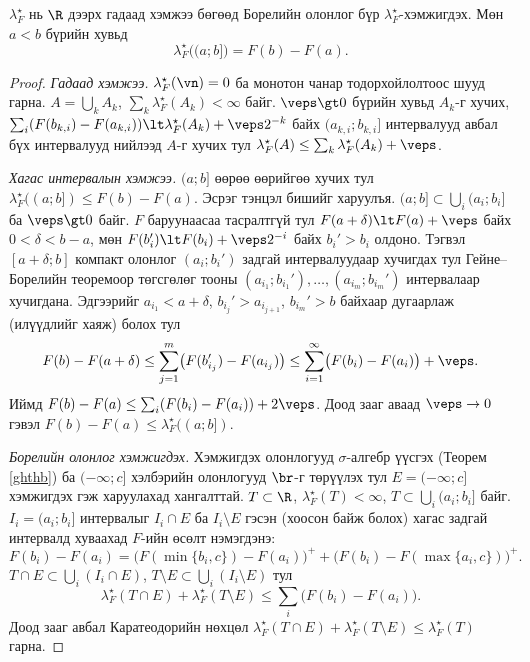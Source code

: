 \begin{thm}\label{lsmeas}
$\lambda_F^{\star}$ нь $\R$ дээрх гадаад хэмжээ бөгөөд Борелийн олонлог бүр $\lambda_F^{\star}$-хэмжигдэх. Мөн $a\lt b$ бүрийн хувьд
$$\lambda_F^{\star}\bigl((a;b]\bigr)=F(b)-F(a).$$
\end{thm}
\begin{proof}
\textit{Гадаад хэмжээ.} $\lambda_F^{\star}(\vn)=0$ ба монотон чанар тодорхойлолтоос шууд гарна. $A=\bigcup_kA_k$, $\sum_k\lambda_F^{\star}(A_k)\lt\infty$ байг. $\veps\gt 0$ бүрийн хувьд $A_k$-г хучих, $\sum_i(F(b_{k,i})-F(a_{k,i}))\lt\lambda_F^{\star}(A_k)+\veps 2^{-k}$ байх $(a_{k,i};b_{k,i}]$ интервалууд авбал бүх интервалууд нийлээд $A$-г хучих тул $\lambda_F^{\star}(A)\leq\sum_k\lambda_F^{\star}(A_k)+\veps$.

\textit{Хагас интервалын хэмжээ.} $(a;b]$ өөрөө өөрийгөө хучих тул $\lambda_F^{\star}((a;b])\leq F(b)-F(a)$. Эсрэг тэнцэл бишийг харуулъя. $(a;b]\subset\bigcup_i(a_i;b_i]$ ба $\veps\gt 0$ байг. $F$ баруунаасаа тасралтгүй тул $F(a+\delta)\lt F(a)+\veps$ байх $0\lt\delta\lt b-a$, мөн $F(b_i')\lt F(b_i)+\veps 2^{-i}$ байх $b_i'\gt b_i$ олдоно. Тэгвэл $[a+\delta;b]$ компакт олонлог $(a_i;b_i')$ задгай интервалуудаар хучигдах тул Гейне--Борелийн теоремоор төгсгөлөг тооны $(a_{i_1};b_{i_1}'),\ldots,(a_{i_m};b_{i_m}')$ интервалаар хучигдана. Эдгээрийг $a_{i_1}\lt a+\delta$, $b_{i_j}'\gt a_{i_{j+1}}$, $b_{i_m}'\gt b$ байхаар дугаарлаж (илүүдлийг хаяж) болох тул
$$F(b)-F(a+\delta)\leq\sum_{j=1}^{m}\bigl(F(b_{i_j}')-F(a_{i_j})\bigr)\leq\sum_{i=1}^{\infty}\bigl(F(b_i)-F(a_i)\bigr)+\veps.$$
Иймд $F(b)-F(a)\leq\sum_i(F(b_i)-F(a_i))+2\veps$. Доод зааг аваад $\veps\to 0$ гэвэл $F(b)-F(a)\leq\lambda_F^{\star}((a;b])$.

\textit{Борелийн олонлог хэмжигдэх.} Хэмжигдэх олонлогууд $\sigma$-алгебр үүсгэх (Теорем \ref{ghthb}) ба $(-\infty;c]$ хэлбэрийн олонлогууд $\br$-г төрүүлэх тул $E=(-\infty;c]$ хэмжигдэх гэж харуулахад хангалттай. $T\subset\R$, $\lambda_F^{\star}(T)\lt\infty$, $T\subset\bigcup_i(a_i;b_i]$ байг. $I_i=(a_i;b_i]$ интервалыг $I_i\cap E$ ба $I_i\setminus E$ гэсэн (хоосон байж болох) хагас задгай интервалд хуваахад $F$-ийн өсөлт нэмэгдэнэ:
$$F(b_i)-F(a_i)=\bigl(F(\min\{b_i,c\})-F(a_i)\bigr)^{+}+\bigl(F(b_i)-F(\max\{a_i,c\})\bigr)^{+}.$$
$T\cap E\subset\bigcup_i(I_i\cap E)$, $T\setminus E\subset\bigcup_i(I_i\setminus E)$ тул
$$\lambda_F^{\star}(T\cap E)+\lambda_F^{\star}(T\setminus E)\leq\sum_i\bigl(F(b_i)-F(a_i)\bigr).$$
Доод зааг авбал Каратеодорийн нөхцөл $\lambda_F^{\star}(T\cap E)+\lambda_F^{\star}(T\setminus E)\leq\lambda_F^{\star}(T)$ гарна.
\end{proof}

